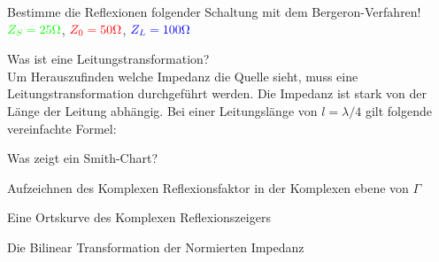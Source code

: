 \begin{karte}{Bestimme die Reflexionen folgender Schaltung mit dem Bergeron-Verfahren!
		\scalebox{.6}{}\\
		 \small $\color{green}Z_S = 25\Omega$, $\color{red}Z_0 = 50\Omega$, $\color{blue}Z_L = 100\Omega$}
	\scalebox{.82}{}
	 
\end{karte}

\begin{karte}{Was ist eine Leitungstransformation?}
	\scalebox{.6}{}\\
	Um Herauszufinden welche Impedanz die Quelle sieht, muss eine Leitungstransformation durchgeführt werden. Die Impedanz ist stark von der Länge der Leitung abhängig.
	Bei einer Leitungslänge von $l=\lambda/4$ gilt folgende vereinfachte Formel:
\end{karte}

\begin{karte}{Was zeigt ein Smith-Chart?}
	\begin{compactitem}
		\item Aufzeichnen des Komplexen Reflexionsfaktor in der Komplexen ebene von $\Gamma$
		\item Eine Ortskurve des Komplexen Reflexionszeigers
		\item Die Bilinear Transformation der Normierten Impedanz
	\end{compactitem}
	\scalebox{.4}{}
\end{karte}
